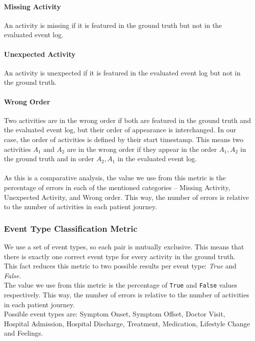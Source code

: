 \paragraph{Missing Activity} An activity is missing if it is featured in the ground truth but not in the evaluated event log. 
\paragraph{Unexpected Activity} An activity is unexpected if it is featured in the evaluated event log but not in the ground truth.
\paragraph{Wrong Order} Two activities are in the wrong order if both are featured in the ground truth and the evaluated event log, but their order of appearance is interchanged. In our case, the order of activities is defined by their start timestamp. This means two activities $A_1 \text{ and } A_2$ are in the wrong order if they appear in the order $A_1,A_2$ in the ground truth and in order $A_2, A_1$ in the evaluated event log.\\\\
As this is a comparative analysis, the value we use from this metric is the percentage of errors in each of the mentioned categories – Missing Activity, Unexpected Activity, and Wrong order. This way, the number of errors is relative to the number of activities in each patient journey.

\subsubsection{Event Type Classification Metric}\label{sec:eventtype_metric}
We use a set of event types, so each pair is mutually exclusive. This means that there is exactly one correct event type for every activity in the ground truth. This fact reduces this metric to two possible results per event type: \emph{True} and \emph{False.}\\
The value we use from this metric is the percentage of \verb|True| and \verb|False| values respectively. This way, the number of errors is relative to the number of activities in each patient journey.\\
Possible event types are: Symptom Onset, Symptom Offset, Doctor Visit, Hospital Admission, Hospital Discharge, Treatment, Medication, Lifestyle Change and Feelings.

